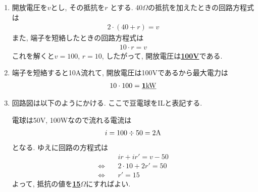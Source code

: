 \documentclass[dvipdfmx,titlepage, 11pt, a4paper]{jsarticle}%
\begin{document}
\begin{enumerate}[(1)]
  \begin{enumerate}[(${1}-$a)]
    \setlength{\itemsep}{15pt}
  \item 開放電圧を$v$とし, その抵抗を$r$ とする. 40$\Omega$の抵抗を加えたときの回路方程式は
    \begin{eqnarray*}
      2\cdot (40+r) = v 
    \end{eqnarray*}
    また, 端子を短絡したときの回路方程式は
    \begin{eqnarray*}
      10\cdot r = v
    \end{eqnarray*}
    これを解くと$v=100,\,r=10$, したがって, 開放電圧は\underline{\bf 100V}である.
  \item 端子を短絡すると10A流れて, 開放電圧は100Vであるから最大電力は
    \begin{eqnarray*}
      10\cdot 100 = \underline{\bf 1{\rm kW}}
    \end{eqnarray*}
  \item 回路図は以下のようにかける. ここで豆電球をILと表記する.
        \begin{center}
    \end{center}
    電球は50V, 100Wなので流れる電流は
    \begin{eqnarray*}
      i = 100\div 50 = 2{\rm A}
    \end{eqnarray*}
    となる. ゆえに回路の方程式は
    \begin{eqnarray*}
      &&ir+ir' = v-50\\
      \Longleftrightarrow\ && 2\cdot 10+2r' = 50\\
      \Longleftrightarrow\ && r' = 15
    \end{eqnarray*}
    よって, 抵抗の値を\underline{\bf 15$\Omega$}にすればよい.
  \end{enumerate}
\end{enumerate}
\newpage
\section{}
\end{document}
